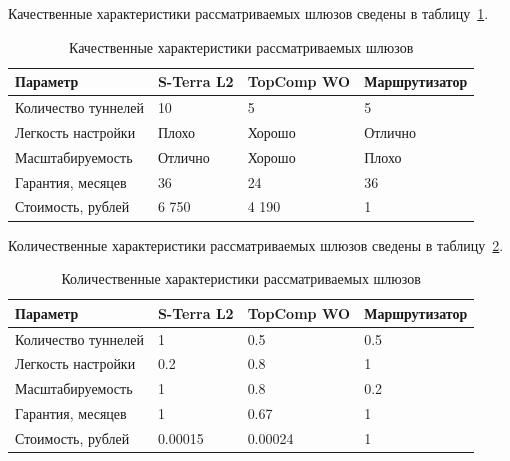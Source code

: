 \documentclass[russian,utf8,emptystyle]{eskdtext}
\begin{document}
Качественные характеристики рассматриваемых шлюзов сведены в таблицу~\ref{tab:vpn-1}.

\begin{longtable}{p{7cm}|p{2cm}|p{2cm}|p{2cm}}
\caption{Качественные характеристики рассматриваемых шлюзов}
\label{tab:vpn-1} \\
Параметр                     & S-Terra L2 & TopComp WO & Маршрутизатор \\ 
\hline 
Количество туннелей          & 10         & 5          & 5        \\ 
Легкость настройки           & Плохо      & Хорошо     & Отлично  \\ 
Масштабируемость             & Отлично    & Хорошо     & Плохо    \\ 
Гарантия, месяцев            & 36         & 24         & 36       \\ 
Стоимость, рублей            & 6 750      & 4 190      & 1        \\
\end{longtable}

Количественные характеристики рассматриваемых шлюзов сведены в таблицу~\ref{tab:vpn-2}.

\begin{longtable}{p{7cm}|p{2cm}|p{2cm}|p{2cm}}
\caption{Количественные характеристики рассматриваемых шлюзов}
\label{tab:vpn-2} \\
Параметр                     & S-Terra L2 & TopComp WO & Маршрутизатор \\ 
\hline 
Количество туннелей          & 1          & 0.5        & 0.5        \\ 
Легкость настройки           & 0.2        & 0.8        & 1       \\ 
Масштабируемость             & 1          & 0.8        & 0.2    \\ 
Гарантия, месяцев            & 1          & 0.67       & 1       \\ 
Стоимость, рублей            & 0.00015    & 0.00024    & 1        \\
\end{longtable}
\end{document}
